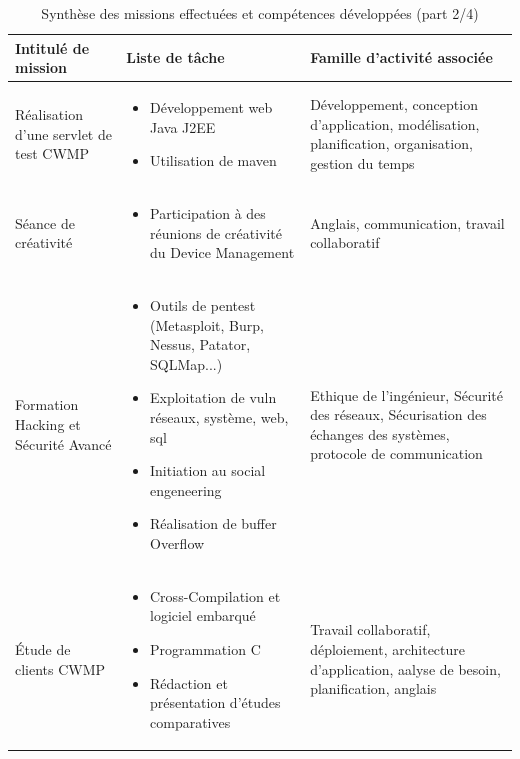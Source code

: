 \documentclass[12pt,a4paper]{report}
\begin{document}
\begin{table}
	\begin{tabularx}{16cm}{|X|X|X|}
		\hline
		Intitulé de mission & Liste de tâche & Famille d'activité associée\tabularnewline
		\hline
		Réalisation d'une servlet de test CWMP 
			& 
				\begin{itemize}
				\item Développement web Java J2EE
				\item Utilisation de maven 
				\end{itemize}
			& Développement, conception d'application, modélisation, planification, organisation, gestion du temps \tabularnewline
		\hline
		Séance de créativité 
			& 
				\begin{itemize}
				\item Participation à des réunions de créativité du Device Management
				\end{itemize}
			& Anglais, communication, travail collaboratif \tabularnewline
		\hline
		Formation Hacking et Sécurité Avancé 
			& 
				\begin{itemize}
				\item Outils de pentest (Metasploit, Burp, Nessus, Patator, SQLMap...)
				\item Exploitation de vuln réseaux, système, web, sql
				\item Initiation au social engeneering
				\item Réalisation de buffer Overflow
				\end{itemize}
			& Ethique de l'ingénieur, Sécurité des réseaux, Sécurisation des échanges des systèmes, protocole de communication \tabularnewline
		\hline
		Étude de clients CWMP 
			& 
				\begin{itemize}
				\item Cross-Compilation et logiciel embarqué
				\item Programmation C
				\item Rédaction et présentation d'études comparatives
				\end{itemize}
			& Travail collaboratif, déploiement, architecture d'application, aalyse de besoin, planification, anglais 
			 \tabularnewline
		\hline
		\end{tabularx}
	\centering
	\caption{Synthèse des missions effectuées et compétences développées (part 2/4)}
\end{table}
\end{document}
